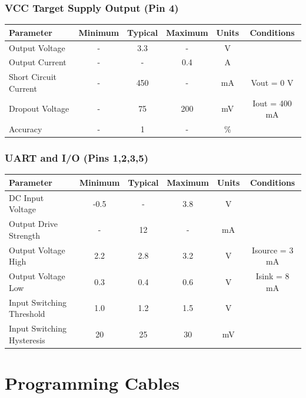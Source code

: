 \documentclass[10pt,letterpaper]{datasheet}
\begin{document}
\begin{flushleft}
    \subsubsection*{VCC Target Supply Output (Pin 4)}
    \label{tab:elec-sup}
    \begin{tabular}{|l|c|c|c|c|c|}
      \hline
      Parameter &
      Minimum &
      Typical &
      Maximum &
      Units &
      Conditions \\
      \hline
      Output Voltage & - & 3.3 & - & V & \\
      Output Current & - & - & 0.4 & A & \\
      Short Circuit Current & - & 450 & - & mA & Vout = 0 V \\
      Dropout Voltage & - & 75 & 200 & mV & Iout = 400 mA \\
      Accuracy & - & 1 & - & \% & \\
      \hline
    \end{tabular}

    \subsubsection*{UART and I/O (Pins 1,2,3,5)}
    \label{tab:elec-io}
    \begin{tabular}{|l|c|c|c|c|c|}
      \hline
      Parameter &
      Minimum &
      Typical &
      Maximum &
      Units &
      Conditions \\
      \hline
      DC Input Voltage & -0.5 & - & 3.8 & V & \\
      Output Drive Strength & - & 12 & - & mA & \\
      Output Voltage High & 2.2 & 2.8 & 3.2 & V & Isource = 3 mA \\
      Output Voltage Low & 0.3 & 0.4 & 0.6 & V & Isink = 8 mA \\
      Input Switching Threshold & 1.0 & 1.2 & 1.5 & V & \\
      Input Switching Hysteresis & 20 & 25 & 30 & mV & \\
      \hline
    \end{tabular}
\end{flushleft}

\newpage

\section*{Programming Cables}
\end{document}
